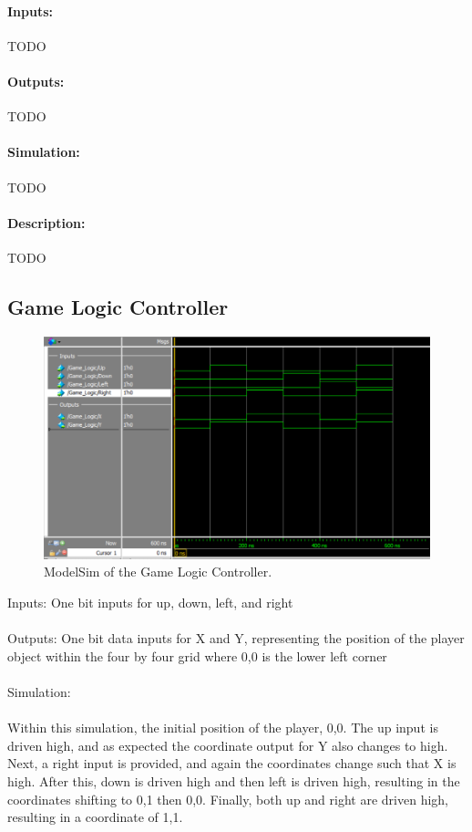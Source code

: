\documentclass[]{article}
\begin{document}
\paragraph{Inputs:} TODO
\paragraph{Outputs:} TODO
\paragraph{Simulation:} TODO
\paragraph{Description:} TODO

\subsection{Game Logic Controller}
\begin{figure}[H]\centering
	\includegraphics[width=\linewidth]{Game_Logic_ModelSim.png}
	\caption{ModelSim of the Game Logic Controller.}
\end{figure}
Inputs: One bit inputs for up, down, left, and right\\~\\
Outputs: One bit data inputs for X and Y, representing the position of the player object within the four by four grid where 0,0 is the lower left corner \\~\\
Simulation: \\~\\
Within this simulation, the initial position of the player, 0,0. The up input is driven high, and as expected the coordinate output for Y also changes to high. Next, a right input is provided, and again the coordinates change such that X is high. After this, down is driven high and then left is driven high, resulting in the coordinates shifting to 0,1 then 0,0. Finally, both up and right are driven high, resulting in a coordinate of 1,1.\\~\\
\end{document}

